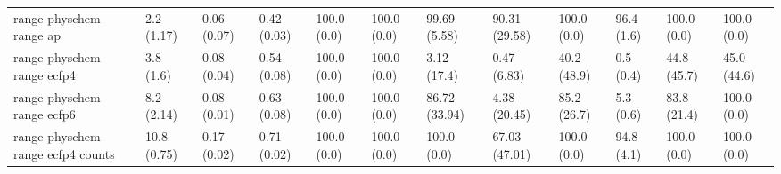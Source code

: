 \begin{tabular}{llllllllllll}
range physchem range ap & {\cellcolor[HTML]{F4FBFC}} \color[HTML]{000000} 2.2 (1.17) & {\cellcolor[HTML]{F7FCFD}} \color[HTML]{000000} 0.06 (0.07) & {\cellcolor[HTML]{2B9452}} \color[HTML]{F1F1F1} 0.42 (0.03) & {\cellcolor[HTML]{F7FCFD}} \color[HTML]{000000} 100.0 (0.0) & {\cellcolor[HTML]{F7FCFD}} \color[HTML]{000000} 100.0 (0.0) & {\cellcolor[HTML]{00441B}} \color[HTML]{F1F1F1} 99.69 (5.58) & {\cellcolor[HTML]{006328}} \color[HTML]{F1F1F1} 90.31 (29.58) & {\cellcolor[HTML]{00441B}} \color[HTML]{F1F1F1} 100.0 (0.0) & {\cellcolor[HTML]{004E1F}} \color[HTML]{F1F1F1} 96.4 (1.6) & {\cellcolor[HTML]{00441B}} \color[HTML]{F1F1F1} 100.0 (0.0) & {\cellcolor[HTML]{59BB93}} \color[HTML]{F1F1F1} 100.0 (0.0) \\
range physchem range ecfp4 & {\cellcolor[HTML]{F2FAFC}} \color[HTML]{000000} 3.8 (1.6) & {\cellcolor[HTML]{F7FCFD}} \color[HTML]{000000} 0.08 (0.04) & {\cellcolor[HTML]{47B17E}} \color[HTML]{F1F1F1} 0.54 (0.08) & {\cellcolor[HTML]{00441B}} \color[HTML]{F1F1F1} 100.0 (0.0) & {\cellcolor[HTML]{00441B}} \color[HTML]{F1F1F1} 100.0 (0.0) & {\cellcolor[HTML]{F2FAFC}} \color[HTML]{000000} 3.12 (17.4) & {\cellcolor[HTML]{F6FCFD}} \color[HTML]{000000} 0.47 (6.83) & {\cellcolor[HTML]{00441B}} \color[HTML]{F1F1F1} 40.2 (48.9) & {\cellcolor[HTML]{005522}} \color[HTML]{F1F1F1} 0.5 (0.4) & {\cellcolor[HTML]{00441B}} \color[HTML]{F1F1F1} 44.8 (45.7) & {\cellcolor[HTML]{00441B}} \color[HTML]{F1F1F1} 45.0 (44.6) \\
range physchem range ecfp6 & {\cellcolor[HTML]{ECF8FA}} \color[HTML]{000000} 8.2 (2.14) & {\cellcolor[HTML]{F6FCFD}} \color[HTML]{000000} 0.08 (0.01) & {\cellcolor[HTML]{27904C}} \color[HTML]{F1F1F1} 0.63 (0.08) & {\cellcolor[HTML]{00441B}} \color[HTML]{F1F1F1} 100.0 (0.0) & {\cellcolor[HTML]{00441B}} \color[HTML]{F1F1F1} 100.0 (0.0) & {\cellcolor[HTML]{016E2D}} \color[HTML]{F1F1F1} 86.72 (33.94) & {\cellcolor[HTML]{F1FAFC}} \color[HTML]{000000} 4.38 (20.45) & {\cellcolor[HTML]{117B38}} \color[HTML]{F1F1F1} 85.2 (26.7) & {\cellcolor[HTML]{17813D}} \color[HTML]{F1F1F1} 5.3 (0.6) & {\cellcolor[HTML]{117B38}} \color[HTML]{F1F1F1} 83.8 (21.4) & {\cellcolor[HTML]{006D2C}} \color[HTML]{F1F1F1} 100.0 (0.0) \\
range physchem range ecfp4 counts & {\cellcolor[HTML]{E8F6FA}} \color[HTML]{000000} 10.8 (0.75) & {\cellcolor[HTML]{F7FCFD}} \color[HTML]{000000} 0.17 (0.02) & {\cellcolor[HTML]{28914D}} \color[HTML]{F1F1F1} 0.71 (0.02) & {\cellcolor[HTML]{F7FCFD}} \color[HTML]{000000} 100.0 (0.0) & {\cellcolor[HTML]{F7FCFD}} \color[HTML]{000000} 100.0 (0.0) & {\cellcolor[HTML]{00441B}} \color[HTML]{F1F1F1} 100.0 (0.0) & {\cellcolor[HTML]{36A164}} \color[HTML]{F1F1F1} 67.03 (47.01) & {\cellcolor[HTML]{00441B}} \color[HTML]{F1F1F1} 100.0 (0.0) & {\cellcolor[HTML]{005020}} \color[HTML]{F1F1F1} 94.8 (4.1) & {\cellcolor[HTML]{00441B}} \color[HTML]{F1F1F1} 100.0 (0.0) & {\cellcolor[HTML]{00441B}} \color[HTML]{F1F1F1} 100.0 (0.0) \\

\end{tabular}
